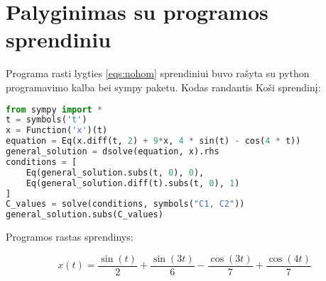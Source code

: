 \documentclass[11pt]{article}
\begin{document}
\section{Palyginimas su programos sprendiniu}

Programa rasti lygties \eqref{eqs:nohom} sprendiniui buvo rašyta su python programavimo
kalba bei sympy paketu. Kodas randantis Koši sprendinį:

\begin{lstlisting}[language=Python]
from sympy import *
t = symbols('t')
x = Function('x')(t)
equation = Eq(x.diff(t, 2) + 9*x, 4 * sin(t) - cos(4 * t))
general_solution = dsolve(equation, x).rhs
conditions = [
    Eq(general_solution.subs(t, 0), 0),
    Eq(general_solution.diff(t).subs(t, 0), 1)
]
C_values = solve(conditions, symbols("C1, C2"))
general_solution.subs(C_values)
\end{lstlisting}

Programos rastas sprendinys:

$$
x(t)=\frac{\sin(t)}{2}+\frac{\sin(3t)}{6}-\frac{\cos(3t)}{7}+\frac{\cos(4t)}{7}
$$
\end{document}
